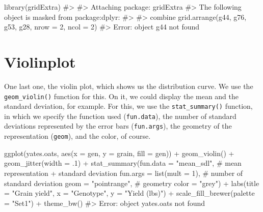 \documentclass[
  letterpaper,
  DIV=11,
  numbers=noendperiod]{scrreprt}
\newenvironment{Shaded}{\begin{snugshade}}{\end{snugshade}}
\newcommand{\AttributeTok}[1]{\textcolor[rgb]{0.40,0.45,0.13}{#1}}
\newcommand{\CommentTok}[1]{\textcolor[rgb]{0.37,0.37,0.37}{#1}}
\newcommand{\DecValTok}[1]{\textcolor[rgb]{0.68,0.00,0.00}{#1}}
\newcommand{\FunctionTok}[1]{\textcolor[rgb]{0.28,0.35,0.67}{#1}}
\newcommand{\NormalTok}[1]{\textcolor[rgb]{0.00,0.23,0.31}{#1}}
\newcommand{\SpecialCharTok}[1]{\textcolor[rgb]{0.37,0.37,0.37}{#1}}
\newcommand{\StringTok}[1]{\textcolor[rgb]{0.13,0.47,0.30}{#1}}
\begin{document}
\begin{Shaded}
\begin{Highlighting}[]
\FunctionTok{library}\NormalTok{(gridExtra)}
\CommentTok{\#\textgreater{} }
\CommentTok{\#\textgreater{} Attaching package: \textquotesingle{}gridExtra\textquotesingle{}}
\CommentTok{\#\textgreater{} The following object is masked from \textquotesingle{}package:dplyr\textquotesingle{}:}
\CommentTok{\#\textgreater{} }
\CommentTok{\#\textgreater{}     combine}
\FunctionTok{grid.arrange}\NormalTok{(g44, g76, g53, g28,}
          \AttributeTok{nrow =} \DecValTok{2}\NormalTok{, }\AttributeTok{ncol =} \DecValTok{2}\NormalTok{)}
\CommentTok{\#\textgreater{} Error: object \textquotesingle{}g44\textquotesingle{} not found}
\end{Highlighting}
\end{Shaded}

\section{Violinplot}\label{violinplot}

One last one, the violin plot, which shows us the distribution curve. We
use the \texttt{geom\_violin()} function for this. On it, we could
display the mean and the standard deviation, for example. For this, we
use the \texttt{stat\_summary()} function, in which we specify the
function used (\texttt{fun.data}), the number of standard deviations
represented by the error bars (\texttt{fun.args}), the geometry of the
representation (\texttt{geom}), and the color, of course.

\begin{Shaded}
\begin{Highlighting}[]

\FunctionTok{ggplot}\NormalTok{(yates.oats, }\FunctionTok{aes}\NormalTok{(}\AttributeTok{x =}\NormalTok{ gen, }\AttributeTok{y =}\NormalTok{ grain, }\AttributeTok{fill =}\NormalTok{ gen)) }\SpecialCharTok{+}
  \FunctionTok{geom\_violin}\NormalTok{() }\SpecialCharTok{+}
  \FunctionTok{geom\_jitter}\NormalTok{(}\AttributeTok{width =}\NormalTok{ .}\DecValTok{1}\NormalTok{) }\SpecialCharTok{+} 
    \FunctionTok{stat\_summary}\NormalTok{(}\AttributeTok{fun.data =} \StringTok{"mean\_sdl"}\NormalTok{, }\CommentTok{\# mean representation + standard deviation}
               \AttributeTok{fun.args =} \FunctionTok{list}\NormalTok{(}\AttributeTok{mult =} \DecValTok{1}\NormalTok{), }\CommentTok{\# number of standard deviation}
               \AttributeTok{geom =} \StringTok{"pointrange"}\NormalTok{, }\CommentTok{\# geometry }
               \AttributeTok{color =} \StringTok{"grey"}\NormalTok{) }\SpecialCharTok{+}
  \FunctionTok{labs}\NormalTok{(}\AttributeTok{title =} \StringTok{"Grain yield"}\NormalTok{, }\AttributeTok{x =} \StringTok{"Genotype"}\NormalTok{, }\AttributeTok{y =} \StringTok{"Yield (lbs)"}\NormalTok{) }\SpecialCharTok{+}
  \FunctionTok{scale\_fill\_brewer}\NormalTok{(}\AttributeTok{palette =} \StringTok{"Set1"}\NormalTok{) }\SpecialCharTok{+}
  \FunctionTok{theme\_bw}\NormalTok{()}
\CommentTok{\#\textgreater{} Error: object \textquotesingle{}yates.oats\textquotesingle{} not found}
\end{Highlighting}
\end{Shaded}
\end{document}
